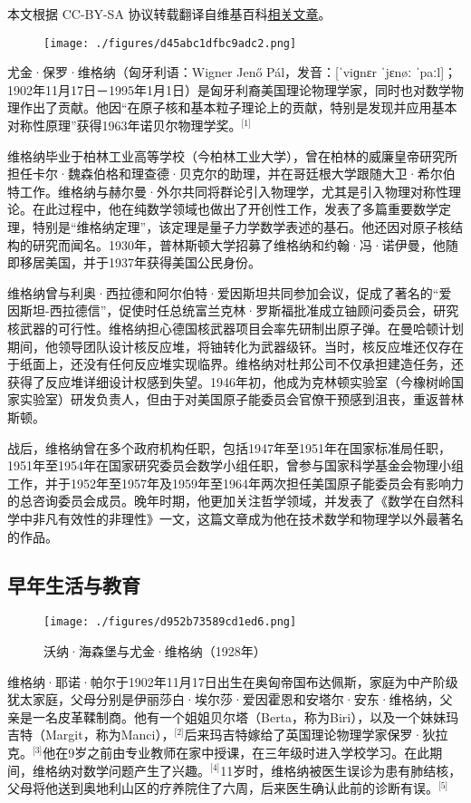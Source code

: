 
本文根据 CC-BY-SA 协议转载翻译自维基百科\href{https://en.wikipedia.org/wiki/Eugene_Wigner}{相关文章}。

\begin{figure}[ht]
\centering
\texttt{[image: ./figures/d45abc1dfbc9adc2.png]}
\caption{} \label{fig_YJwgn_1}
\end{figure}
尤金·保罗·维格纳（匈牙利语：Wigner Jenő Pál，发音：[ˈviɡnɛr ˈjɛnøː ˈpaːl]；1902年11月17日－1995年1月1日）是匈牙利裔美国理论物理学家，同时也对数学物理作出了贡献。他因“在原子核和基本粒子理论上的贡献，特别是发现并应用基本对称性原理”获得1963年诺贝尔物理学奖。\(^\text{[1]}\)

维格纳毕业于柏林工业高等学校（今柏林工业大学），曾在柏林的威廉皇帝研究所担任卡尔·魏森伯格和理查德·贝克尔的助理，并在哥廷根大学跟随大卫·希尔伯特工作。维格纳与赫尔曼·外尔共同将群论引入物理学，尤其是引入物理对称性理论。在此过程中，他在纯数学领域也做出了开创性工作，发表了多篇重要数学定理，特别是“维格纳定理”，该定理是量子力学数学表述的基石。他还因对原子核结构的研究而闻名。1930年，普林斯顿大学招募了维格纳和约翰·冯·诺伊曼，他随即移居美国，并于1937年获得美国公民身份。

维格纳曾与利奥·西拉德和阿尔伯特·爱因斯坦共同参加会议，促成了著名的“爱因斯坦-西拉德信”，促使时任总统富兰克林·罗斯福批准成立铀顾问委员会，研究核武器的可行性。维格纳担心德国核武器项目会率先研制出原子弹。在曼哈顿计划期间，他领导团队设计核反应堆，将铀转化为武器级钚。当时，核反应堆还仅存在于纸面上，还没有任何反应堆实现临界。维格纳对杜邦公司不仅承担建造任务，还获得了反应堆详细设计权感到失望。1946年初，他成为克林顿实验室（今橡树岭国家实验室）研发负责人，但由于对美国原子能委员会官僚干预感到沮丧，重返普林斯顿。

战后，维格纳曾在多个政府机构任职，包括1947年至1951年在国家标准局任职，1951年至1954年在国家研究委员会数学小组任职，曾参与国家科学基金会物理小组工作，并于1952年至1957年及1959年至1964年两次担任美国原子能委员会有影响力的总咨询委员会成员。晚年时期，他更加关注哲学领域，并发表了《数学在自然科学中非凡有效性的非理性》一文，这篇文章成为他在技术数学和物理学以外最著名的作品。
\subsection{早年生活与教育}
\begin{figure}[ht]
\centering
\texttt{[image: ./figures/d952b73589cd1ed6.png]}
\caption{沃纳·海森堡与尤金·维格纳（1928年）} \label{fig_YJwgn_3}
\end{figure}
维格纳·耶诺·帕尔于1902年11月17日出生在奥匈帝国布达佩斯，家庭为中产阶级犹太家庭，父母分别是伊丽莎白·埃尔莎·爱因霍恩和安塔尔·安东·维格纳，父亲是一名皮革鞣制商。他有一个姐姐贝尔塔（Berta，称为Biri），以及一个妹妹玛吉特（Margit，称为Manci），\(^\text{[2]}\)后来玛吉特嫁给了英国理论物理学家保罗·狄拉克。\(^\text{[3]}\)他在9岁之前由专业教师在家中授课，在三年级时进入学校学习。在此期间，维格纳对数学问题产生了兴趣。\(^\text{[4]}\)11岁时，维格纳被医生误诊为患有肺结核，父母将他送到奥地利山区的疗养院住了六周，后来医生确认此前的诊断有误。\(^\text{[5]}\)

